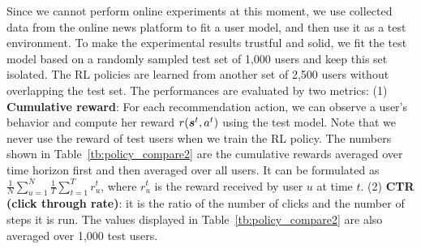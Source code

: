 \documentclass{article} %
\begin{document}
Since we cannot perform online experiments at this moment, we use collected data from the online news platform to fit a user model, and then use it as a test environment. To make the experimental results trustful and solid, we fit the test model based on a randomly sampled test set of 1,000 users and keep this set isolated. 
The RL policies are learned from another set of 2,500 users without overlapping the test set. The performances are evaluated by two metrics: {(1) \bf Cumulative reward}: For each recommendation action, we can observe a user's behavior and compute her reward $r({\bm{s}}^t,a^t)$ using the test model. 
Note that we never use the reward of test users when we train the RL policy. The numbers shown in Table~\ref{tb:policy_compare2} are the cumulative rewards averaged over time horizon first and then averaged over all users. It can be formulated as {\small$\frac{1}{N}\sum_{u=1}^{N} \frac{1}{T}\sum_{t=1}^T$}$ r^t_u$, where $r^t_u$ is the reward received by user $u$ at time $t$. (2) {\bf CTR (click through rate)}: it is the ratio of the number of clicks and the number of steps it is run. The values displayed in Table~\ref{tb:policy_compare2} are also averaged over 1,000 test users. 
\end{document}
